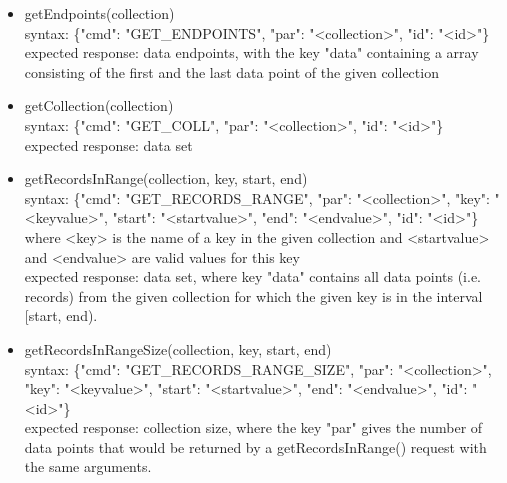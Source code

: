 \documentclass[oneside, english, final]{design}
\begin{document}
\begin{itemize}
	\item{getEndpoints(collection)}
	      \\
	      syntax: \{"cmd": "GET\_ENDPOINTS", "par": "<collection>", "id": "<id>"\} \\
	      expected response: data endpoints, with the key "data" containing a array consisting of the first and the last data point of the given collection

	\item{getCollection(collection)}
	      \\
	      syntax: \{"cmd": "GET\_COLL", "par": "<collection>", "id": "<id>"\} \\
	      expected response: data set

	\item{getRecordsInRange(collection, key, start, end)}
	      \\
	      syntax: \{"cmd": "GET\_RECORDS\_RANGE", "par": "<collection>", "key": "<keyvalue>", "start": "<startvalue>", "end": "<endvalue>", "id": "<id>"\} \\
	      where <key> is the name of a key in the given collection and <startvalue> and <endvalue> are valid values for this key\\
	      expected response: data set, where key "data" contains all data points (i.e. records) from the given collection for which the given key is in the interval [start, end).

	\item{getRecordsInRangeSize(collection, key, start, end)}
	      \\
	      syntax: \{"cmd": "GET\_RECORDS\_RANGE\_SIZE", "par": "<collection>", "key": "<keyvalue>", "start": "<startvalue>", "end": "<endvalue>", "id": "<id>"\} \\
	      expected response: collection size, where the key "par" gives the number of data points that would be returned by a getRecordsInRange() request with the same arguments.

\end{itemize}

\newpage
\end{document}
